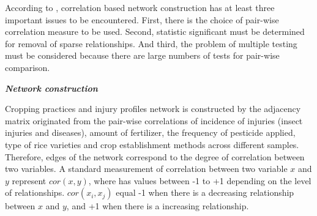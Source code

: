 According to , correlation based network construction has at least three important issues to be encountered. First, there is the choice of pair-wise correlation measure to be used. Second, statistic significant must be determined for removal of sparse relationships. And third, the problem of multiple testing must be considered because there are large numbers of tests for pair-wise comparison.




\textit{\textbf{Network construction}}

Cropping practices and injury profiles network is constructed by the adjacency matrix originated from the pair-wise correlations of incidence of injuries (insect injuries and diseases), amount of fertilizer, the frequency of pesticide applied, type of rice varieties and crop establishment methods across different samples. Therefore, edges of the network correspond to the degree of correlation between two variables. A standard measurement of correlation between two variable $x$ and $y$ represent $cor(x,y)$, where has values between -1 to +1 depending on the level of relationships. $cor(x_{i}, x_{j})$ equal -1 when there is a decreasing relationship between $x$ and $y$, and +1 when there is a increasing relationship.


